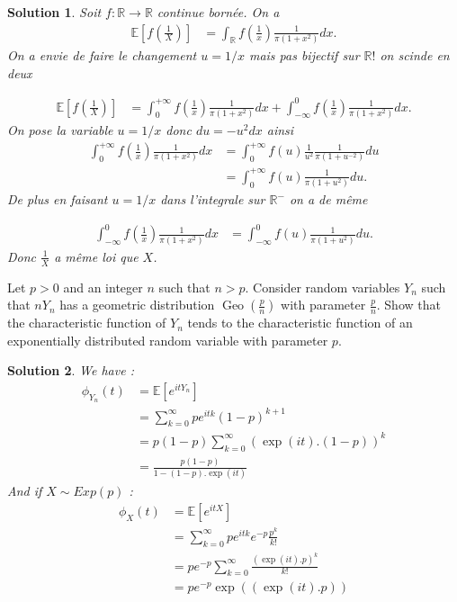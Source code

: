 \documentclass{article}
\newcommand{\esperance}[1]{\mathbb{E}[#1]}
\newtheorem{solution}{Solution}
\begin{document}
\begin{solution}
  Soit $f:\mathbb R\longrightarrow \mathbb R$ continue born\'ee. On a
  \begin{align*}
    \mathbb E[f(\frac1X)] & =\int_\mathbb R f(\frac1x) \frac{1}{\pi(1+x^2)} dx.
  \end{align*}
  On a envie de faire le changement $u=1/x$ mais pas bijectif sur $\mathbb R!$ on scinde en deux

  \begin{align*}
    \mathbb E[f(\frac1X)] & =\int_0^{+\infty} f(\frac1x) \frac{1}{\pi(1+x^2)} dx+ \int_{-\infty}^0 f(\frac1x) \frac{1}{\pi(1+x^2)} dx.
  \end{align*}
  On pose la variable $u=1/x$ donc $du=-u^2 dx$ ainsi
  \begin{align*}
    \int_0^{+\infty} f(\frac1x) \frac{1}{\pi(1+x^2)} dx & =\int_0^{+\infty} f(u)\frac{1}{u^2}  \frac{1}{\pi(1+u^{-2})} du \\
                                                        & =\int_0^{+\infty} f(u) \frac{1}{\pi(1+u^2)} du.
  \end{align*}
  De plus en faisant $u=1/x$ dans l'integrale sur $\mathbb R^-$ on a de m\^eme

  \begin{align*}
    \int_{-\infty}^0 f(\frac1x) \frac{1}{\pi(1+x^2)} dx & =\int_{-\infty}^0 f(u) \frac{1}{\pi(1+u^2)} du.
  \end{align*}
  Donc $\frac1X$ a m\^eme loi que $X$.
\end{solution}

\begin{Exercise}
  Let $p>0$ and an integer $n$ such that $n>p$. Consider random variables $Y_{n}$ such that $n Y_{n}$ has a geometric distribution $\operatorname{Geo}\left(\frac{p}{n}\right)$ with parameter $\frac{p}{n}$. Show that the characteristic function of $Y_{n}$ tends to the characteristic function of an exponentially distributed random variable with parameter $p$.
\end{Exercise}

\begin{solution}
  We have :
  \begin{align*}
    \phi_{Y_n}(t) & = \esperance{e^{itY_n}}                              \\
                  & = \sum_{k = 0}^\infty p e^{itk} (1-p)^{k+1}          \\
                  & = p (1-p) \sum_{k = 0}^\infty (\exp{(it)}.(1-p))^{k} \\
                  & = \frac{p (1-p) }{1-(1-p).\exp{(it)}}
  \end{align*}
  And if $X \sim Exp(p)$ :
  \begin{align*}
    \phi_{X}(t) & = \esperance{e^{itX}}                                      \\
                & = \sum_{k = 0}^\infty p e^{itk} e^{-p} \frac{p^k}{k!}      \\
                & = p e^{-p} \sum_{k = 0}^\infty \frac{(\exp{(it)}.p)^k}{k!} \\
                & = p e^{-p} \exp{((\exp{(it)}.p))}
  \end{align*}
\end{solution}
\end{document}
